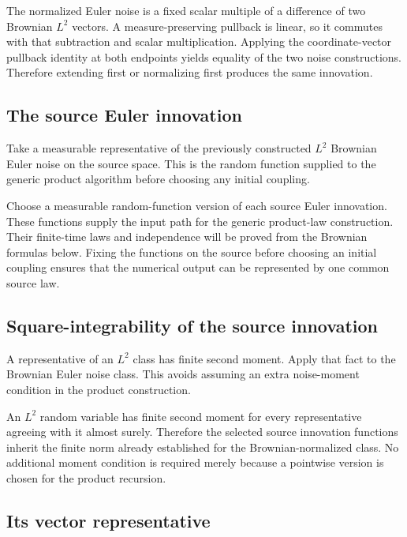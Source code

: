\documentclass[11pt,a4paper]{article}
\begin{document}
The normalized Euler noise is a fixed scalar multiple of a difference of two Brownian \(L^2\) vectors. A measure-preserving pullback is linear, so it commutes with that subtraction and scalar multiplication. Applying the coordinate-vector pullback identity at both endpoints yields equality of the two noise constructions. Therefore extending first or normalizing first produces the same innovation.


\subsection{\texorpdfstring{The source Euler innovation}{The source Euler innovation}}


Take a measurable representative of the previously constructed \(L^2\) Brownian Euler noise on the source space. This is the random function supplied to the generic product algorithm before choosing any initial coupling.



Choose a measurable random-function version of each source Euler innovation. These functions supply the input path for the generic product-law construction. Their finite-time laws and independence will be proved from the Brownian formulas below. Fixing the functions on the source before choosing an initial coupling ensures that the numerical output can be represented by one common source law.


\subsection{\texorpdfstring{Square-integrability of the source innovation}{Square-integrability of the source innovation}}


A representative of an \(L^2\) class has finite second moment. Apply that fact to the Brownian Euler noise class. This avoids assuming an extra noise-moment condition in the product construction.



An \(L^2\) random variable has finite second moment for every representative agreeing with it almost surely. Therefore the selected source innovation functions inherit the finite norm already established for the Brownian-normalized class. No additional moment condition is required merely because a pointwise version is chosen for the product recursion.


\subsection{\texorpdfstring{Its vector representative}{Its vector representative}}
\end{document}
